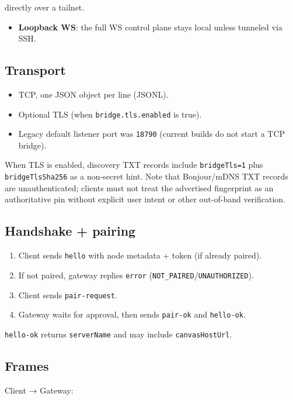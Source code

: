 directly over a tailnet.
\begin{itemize}
  \item \textbf{Loopback WS}: the full WS control plane stays local unless tunneled via SSH.
\end{itemize}


\subsection{Transport}


\begin{itemize}
  \item TCP, one JSON object per line (JSONL).
  \item Optional TLS (when \texttt{bridge.tls.enabled} is true).
  \item Legacy default listener port was \texttt{18790} (current builds do not start a TCP bridge).
\end{itemize}


When TLS is enabled, discovery TXT records include \texttt{bridgeTls=1} plus
\texttt{bridgeTlsSha256} as a non-secret hint. Note that Bonjour/mDNS TXT records are
unauthenticated; clients must not treat the advertised fingerprint as an
authoritative pin without explicit user intent or other out-of-band verification.

\subsection{Handshake + pairing}


\begin{enumerate}
  \item Client sends \texttt{hello} with node metadata + token (if already paired).
  \item If not paired, gateway replies \texttt{error} (\texttt{NOT\_PAIRED}/\texttt{UNAUTHORIZED}).
  \item Client sends \texttt{pair-request}.
  \item Gateway waits for approval, then sends \texttt{pair-ok} and \texttt{hello-ok}.
\end{enumerate}


\texttt{hello-ok} returns \texttt{serverName} and may include \texttt{canvasHostUrl}.

\subsection{Frames}


Client → Gateway:

